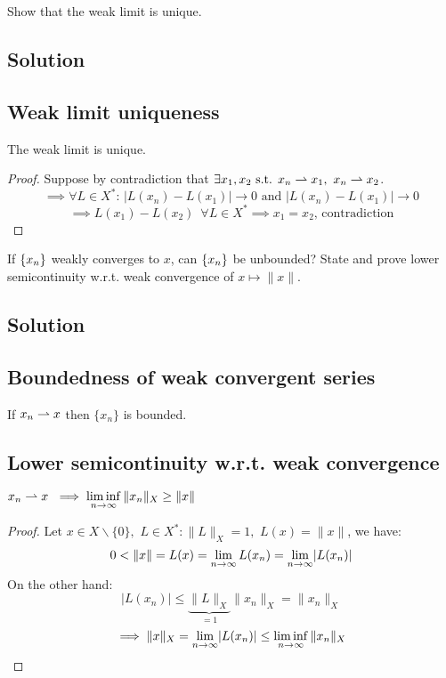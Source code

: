 \sheet


\question
Show that the weak limit is unique.

\subsection*{Solution}

\subsection{Weak limit uniqueness}
The weak limit is unique.

\begin{proof}
    Suppose by contradiction that $\exists x_1,x_2 \mbox{ s.t. }x_n\rightharpoonup x_1,\,\,x_n\rightharpoonup x_2$.
    \[
    \implies \forall L \in X^*:\, \lvert L(x_n)-L(x_1)\rvert \to 0 \mbox{ and } \lvert L(x_n)-L(x_1)\rvert\to 0
    \]
    \[
    \implies L(x_1)-L(x_2)\,\,\, \forall L\in X^* \implies x_1=x_2 \mbox{, contradiction}
    \]
\end{proof}


\question
If $\{ x_n \}$ weakly converges to $x$, can $\{ x_n \}$ be unbounded? State and prove lower semicontinuity w.r.t. weak convergence of $x\mapsto\|x\|$.

\subsection*{Solution}

\subsection{Boundedness of weak convergent series}
If $x_n \rightharpoonup x$ then $\{x_n\}$ is bounded.
\subsection{Lower semicontinuity w.r.t. weak convergence}
$x_n \rightharpoonup x \,\,\implies \displaystyle\liminf_{n\to \infty}\|x_n\|_X \ge \|x\|$
\begin{proof}
    Let $x\in X\backslash \{0\},\,\, L \in X^*:\|L\|_X=1,\,\,L(x)=\|x\|$, we have:
    \[
    0<\|x\|=L(x)=\displaystyle\lim_{n\to\infty}L(x_n)=\displaystyle\lim_{n\to\infty}\lvert L(x_n)\rvert
    \]
    On the other hand: \[
    \lvert L(x_n)\rvert \le \underbrace{\|L\|_X}_{=1} \|x_n\|_X = \|x_n\|_X
    \]
    \[
    \implies \|x\|_X = \lim_{n\to\infty}\lvert L(x_n)\rvert \le \displaystyle\liminf_{n\to \infty}\|x_n\|_X 
    \]
\end{proof}

